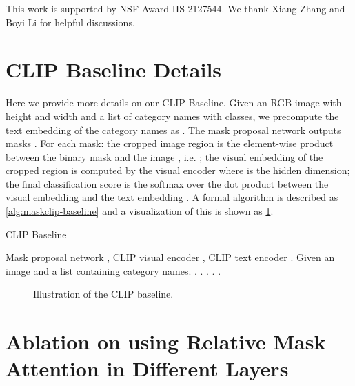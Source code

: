 \documentclass{article}
\theoremstyle{plain}
\theoremstyle{definition}
\theoremstyle{remark}
\begin{document}
 This work is supported by NSF Award IIS-2127544. We thank Xiang Zhang and Boyi Li for helpful discussions.








\newpage
\appendix
\onecolumn





\section{CLIP Baseline Details}

Here we provide more details on our CLIP Baseline. Given an RGB image  with height  and width  and a list of category names with  classes, we precompute the text embedding of the category names as . The mask proposal network  outputs  masks . For each mask: the cropped image region is the element-wise product between the binary mask  and the image , i.e. ; the visual embedding  of the cropped region is computed by the visual encoder where  is the hidden dimension; the final classification score  is the softmax over the dot product between the visual embedding  and the text embedding . 
A formal algorithm is described as \ref{alg:maskclip-baseline} and a visualization of this is shown as \ref{fig:illus-baseline}.

\begin{algorithm}[h]
	\caption{CLIP Baseline}
	\begin{algorithmic}
	    \Require Mask proposal network , CLIP visual encoder , CLIP text encoder .
		\State Given an image  and a list  containing  category names.
		\State .
		\State .
		\For{}
		\State .
		\State .
		\State .
		\EndFor
	\end{algorithmic}
	\label{alg:maskclip-baseline}
\end{algorithm}

\begin{figure}[H]
\centering
{}
\caption{Illustration of the CLIP baseline.}
\label{fig:illus-baseline}
\end{figure}

\section{Ablation on using Relative Mask Attention in Different Layers} 
\end{document}
